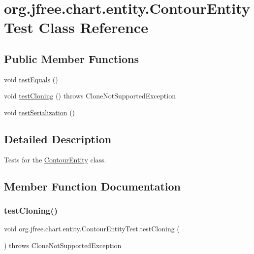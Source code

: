 \hypertarget{classorg_1_1jfree_1_1chart_1_1entity_1_1_contour_entity_test}{}\section{org.\+jfree.\+chart.\+entity.\+Contour\+Entity\+Test Class Reference}
\label{classorg_1_1jfree_1_1chart_1_1entity_1_1_contour_entity_test}
\subsection*{Public Member Functions}
\begin{DoxyCompactItemize}
\item 
void \mbox{\hyperlink{classorg_1_1jfree_1_1chart_1_1entity_1_1_contour_entity_test_a4e2d7f94b540d8e877f9fe56ecf5f2ba}{test\+Equals}} ()
\item 
void \mbox{\hyperlink{classorg_1_1jfree_1_1chart_1_1entity_1_1_contour_entity_test_a9502cdade722b8b2c7e8df7d6b4fd17d}{test\+Cloning}} ()  throws Clone\+Not\+Supported\+Exception 
\item 
void \mbox{\hyperlink{classorg_1_1jfree_1_1chart_1_1entity_1_1_contour_entity_test_a4b27b6813dc1454799035a68d7d2511f}{test\+Serialization}} ()
\end{DoxyCompactItemize}


\subsection{Detailed Description}
Tests for the {\ttfamily \mbox{\hyperlink{classorg_1_1jfree_1_1chart_1_1entity_1_1_contour_entity}{Contour\+Entity}}} class. 

\subsection{Member Function Documentation}
\mbox{\label{classorg_1_1jfree_1_1chart_1_1entity_1_1_contour_entity_test_a9502cdade722b8b2c7e8df7d6b4fd17d}} 
\subsubsection{\texorpdfstring{test\+Cloning()}{testCloning()}}
{\footnotesize\ttfamily void org.\+jfree.\+chart.\+entity.\+Contour\+Entity\+Test.\+test\+Cloning (\begin{DoxyParamCaption}{ }\end{DoxyParamCaption}) throws Clone\+Not\+Supported\+Exception}

